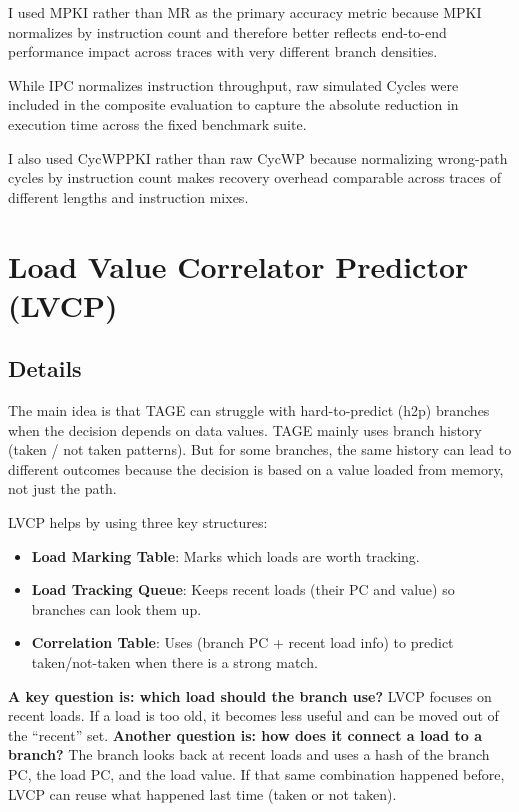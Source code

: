 \documentclass[11pt,a4paper]{article}
\newcommand{\question}[1]{\textbf{\textcolor{blue!40!black}{#1}}}
\begin{document}
I used MPKI rather than MR as the primary accuracy metric because MPKI normalizes by instruction count and
therefore better reflects end-to-end performance impact across traces with very different branch densities.

While IPC normalizes instruction throughput, raw simulated Cycles were included in the composite
evaluation to capture the absolute reduction in execution time across the fixed benchmark suite.

I also used CycWPPKI rather than raw CycWP because normalizing wrong-path cycles by instruction count makes recovery
overhead comparable across traces of different lengths and instruction mixes.
\section{Load Value Correlator Predictor (LVCP)}

\subsection{Details}
The main idea is that TAGE can struggle with hard-to-predict (h2p) branches when the decision depends on data values. TAGE mainly uses branch history (taken / not taken patterns). But for some branches, the same history can lead to different outcomes because the decision is based on a value loaded from memory, not just the path.

LVCP helps by using three key structures:
\begin{itemize}
    \item \textbf{Load Marking Table}: Marks which loads are worth tracking.
    \item \textbf{Load Tracking Queue}: Keeps recent loads (their PC and value) so branches can look them up.
    \item \textbf{Correlation Table}: Uses (branch PC + recent load info) to predict taken/not-taken when there is a strong match.
\end{itemize}

\question{A key question is: which load should the branch use?}
LVCP focuses on recent loads. If a load is too old, it becomes less useful and can be moved out of the “recent” set.
\question{Another question is: how does it connect a load to a branch?}
The branch looks back at recent loads and uses a hash of the branch PC, the load PC, and the load value. If that same combination happened before, LVCP can reuse what happened last time (taken or not taken).
\end{document}
